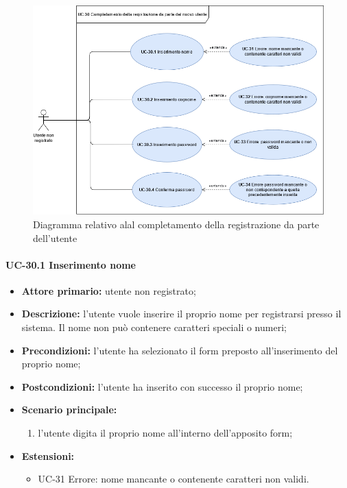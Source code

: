 	\begin{figure}[H]
		\centering
		  \includegraphics[scale=0.45]{src/CasiDUso/immagini/CompletamentoRegistrazione.png}
		\caption{Diagramma relativo alal completamento della registrazione da parte dell'utente}
	\end{figure}
	


\paragraph{UC-30.1 Inserimento nome}

	\begin{itemize}
		\item \textbf{Attore primario:} utente non registrato;

		\item \textbf{Descrizione:} l'utente vuole inserire il proprio nome per registrarsi presso il sistema. Il nome non può contenere caratteri speciali o numeri;

		\item \textbf{Precondizioni:} l'utente ha selezionato il form preposto all'inserimento del proprio nome;

		\item \textbf{Postcondizioni:} l'utente ha inserito con successo il proprio nome;

		\item \textbf{Scenario principale:}
	  	  \begin{enumerate}
		  	\item l'utente digita il proprio nome all'interno dell'apposito form;
	      \end{enumerate}
		\item \textbf{Estensioni:}
	      \begin{itemize}
		      \item UC-31 Errore: nome mancante o contenente caratteri non validi.
	      \end{itemize}
	\end{itemize}

